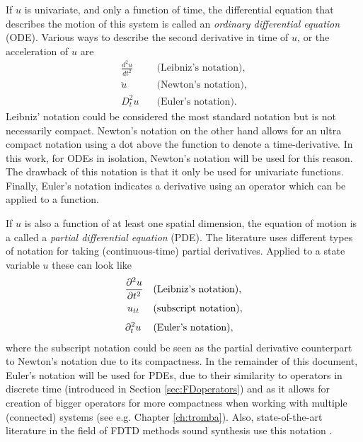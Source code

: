 If $u$ is univariate, and only a function of time, the differential equation that describes the motion of this system is called an \textit{ordinary differential equation} (ODE). Various ways to describe the second derivative in time of $u$, or the acceleration of $u$ are
%
\begin{equation}\nonumber
    \begin{aligned}
        \frac{d^2 u}{d t^2} & \quad \text{(Leibniz's notation)},\\
        \ddot u\ \  &\quad \text{(Newton's notation)},\\[3pt]
        D_t^2 u& \quad \text{(Euler's notation)}.
    \end{aligned}
\end{equation}
%
Leibniz' notation could be considered the most standard notation but is not necessarily compact. Newton's notation on the other hand allows for an ultra compact notation using a dot above the function to denote a time-derivative. In this work, for ODEs in isolation, Newton's notation will be used for this reason. The drawback of this notation is that it only be used for univariate functions. Finally, Euler's notation indicates a derivative using an operator which can be applied to a function. 
 
If $u$ is also a function of at least one spatial dimension, the equation of motion is a called a \textit{partial differential equation} (PDE).
The literature uses different types of notation for taking (continuous-time) partial derivatives. Applied to a state variable $u$ these can look like 
\begin{equation}\nonumber
    \begin{aligned}
        \frac{\partial^2 u}{\partial t^2} & \quad \text{(Leibniz's notation)},\\
        u_{tt}\:\,& \quad \text{(subscript notation)},\\[3pt]
        \partial_t^2 u\: & \quad \text{(Euler's notation)},
    \end{aligned}
\end{equation}
% 
%
%
where the subscript notation could be seen as the partial derivative counterpart to Newton's notation due to its compactness. In the remainder of this document, Euler's notation will be used for PDEs, due to their similarity to operators in discrete time (introduced in Section \ref{sec:FDoperators}) and as it allows for creation of bigger operators for more compactness when working with multiple (connected) systems (see e.g. Chapter \ref{ch:tromba}). Also, state-of-the-art literature in the field of FDTD methods sound synthesis use this notation \cite{Bilbao2018}.

